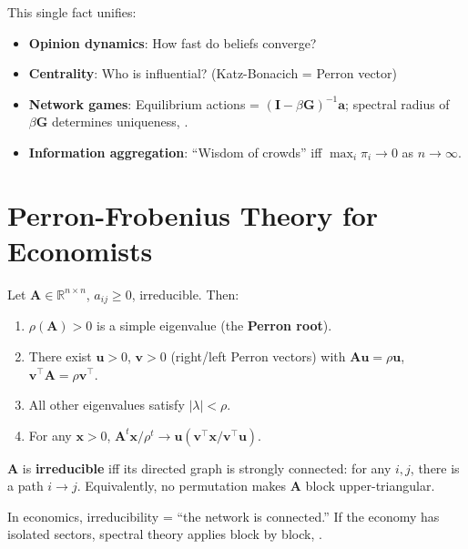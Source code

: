 This single fact unifies:
\begin{itemize}
    \item \textbf{Opinion dynamics}: How fast do beliefs converge?
    \item \textbf{Centrality}: Who is influential? (Katz-Bonacich = Perron vector)
    \item \textbf{Network games}: Equilibrium actions = $(\bm{I} - \beta \bm{G})^{-1} \bm{a}$; spectral radius of $\beta \bm{G}$ determines uniqueness, \cite{golub2026spectral}.
    \item \textbf{Information aggregation}: ``Wisdom of crowds'' iff $\max_i \pi_i \to 0$ as $n \to \infty$.
\end{itemize}

\section{Perron-Frobenius Theory for Economists} \cite{golub2026spectral}
\label{sec:spec:pf}

\begin{theorem} \cite{golub2026spectral}
Let $\bm{A} \in \mathbb{R}^{n \times n}$, $a_{ij} \ge 0$, irreducible. Then:
\begin{enumerate}
    \item $\rho(\bm{A}) > 0$ is a simple eigenvalue (the \textbf{Perron root}).
    \item There exist $\bm{u} > 0$, $\bm{v} > 0$ (right/left Perron vectors) with $\bm{A}\bm{u} = \rho\bm{u}$, $\bm{v}^\top\bm{A} = \rho\bm{v}^\top$.
    \item All other eigenvalues satisfy $|\lambda| < \rho$.
    \item For any $\bm{x} > 0$, $\bm{A}^t \bm{x} / \rho^t \to \bm{u} (\bm{v}^\top \bm{x} / \bm{v}^\top \bm{u})$.
\end{enumerate}
\end{theorem}

\begin{definition}[Irreducibility]
$\bm{A}$ is \textbf{irreducible} iff its directed graph is strongly connected: for any $i,j$, there is a path $i \to j$. Equivalently, no permutation makes $\bm{A}$ block upper-triangular.
\end{definition}

In economics, irreducibility = ``the network is connected.'' If the economy has isolated sectors, spectral theory applies block by block, \cite{golub2026spectral}.

